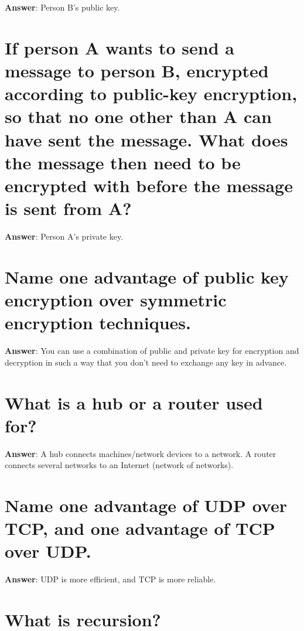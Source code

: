 \documentclass[a4paper,11pt,oneside]{book}
\begin{document}
\begin{sloppypar}
\label{q:168:sa:en:True}

\textbf{Answer}: Person B's public key.



\section{If person A wants to send a message to person B, encrypted according to public-key encryption, so that no one other than A can have sent the message. What does the message then need to be encrypted with before the message is sent from A?}

\label{q:169:sa:en:True}

\textbf{Answer}: Person A's private key.



\section{Name one advantage of public key encryption over symmetric encryption techniques.}

\label{q:170:sa:en:True}

\textbf{Answer}: You can use a combination of public and private key for encryption and decryption in such a way that you don't need to exchange any key in advance.



\section{What is a hub or a router used for?}

\label{q:171:sa:en:True}

\textbf{Answer}: A hub connects machines/network devices to a network. A router connects several networks to an Internet (network of networks).



\section{Name one advantage of UDP over TCP, and one advantage of TCP over UDP.}

\label{q:172:sa:en:True}

\textbf{Answer}: UDP is more efficient, and TCP is more reliable.



\section{What is recursion?}


\end{sloppypar}
\end{document}
